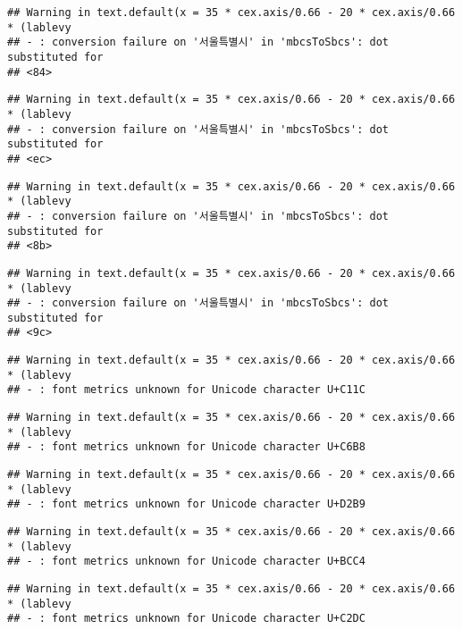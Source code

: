 \documentclass[
]{article}
\begin{document}
\begin{verbatim}
## Warning in text.default(x = 35 * cex.axis/0.66 - 20 * cex.axis/0.66 * (lablevy
## - : conversion failure on '서울특별시' in 'mbcsToSbcs': dot substituted for
## <84>
\end{verbatim}

\begin{verbatim}
## Warning in text.default(x = 35 * cex.axis/0.66 - 20 * cex.axis/0.66 * (lablevy
## - : conversion failure on '서울특별시' in 'mbcsToSbcs': dot substituted for
## <ec>
\end{verbatim}

\begin{verbatim}
## Warning in text.default(x = 35 * cex.axis/0.66 - 20 * cex.axis/0.66 * (lablevy
## - : conversion failure on '서울특별시' in 'mbcsToSbcs': dot substituted for
## <8b>
\end{verbatim}

\begin{verbatim}
## Warning in text.default(x = 35 * cex.axis/0.66 - 20 * cex.axis/0.66 * (lablevy
## - : conversion failure on '서울특별시' in 'mbcsToSbcs': dot substituted for
## <9c>
\end{verbatim}

\begin{verbatim}
## Warning in text.default(x = 35 * cex.axis/0.66 - 20 * cex.axis/0.66 * (lablevy
## - : font metrics unknown for Unicode character U+C11C
\end{verbatim}

\begin{verbatim}
## Warning in text.default(x = 35 * cex.axis/0.66 - 20 * cex.axis/0.66 * (lablevy
## - : font metrics unknown for Unicode character U+C6B8
\end{verbatim}

\begin{verbatim}
## Warning in text.default(x = 35 * cex.axis/0.66 - 20 * cex.axis/0.66 * (lablevy
## - : font metrics unknown for Unicode character U+D2B9
\end{verbatim}

\begin{verbatim}
## Warning in text.default(x = 35 * cex.axis/0.66 - 20 * cex.axis/0.66 * (lablevy
## - : font metrics unknown for Unicode character U+BCC4
\end{verbatim}

\begin{verbatim}
## Warning in text.default(x = 35 * cex.axis/0.66 - 20 * cex.axis/0.66 * (lablevy
## - : font metrics unknown for Unicode character U+C2DC
\end{verbatim}
\end{document}
